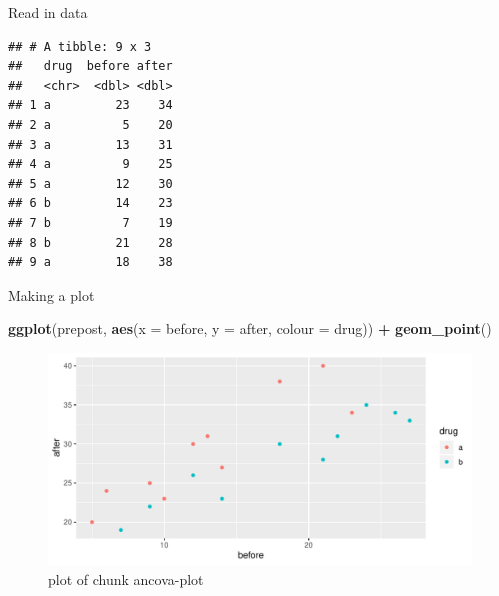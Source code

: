 \documentclass[ignorenonframetext,]{beamer}
\newenvironment{Shaded}{\begin{snugshade}}{\end{snugshade}}
\newcommand{\CommentTok}[1]{\textcolor[rgb]{0.56,0.35,0.01}{\textit{#1}}}
\newcommand{\DataTypeTok}[1]{\textcolor[rgb]{0.13,0.29,0.53}{#1}}
\newcommand{\DecValTok}[1]{\textcolor[rgb]{0.00,0.00,0.81}{#1}}
\newcommand{\KeywordTok}[1]{\textcolor[rgb]{0.13,0.29,0.53}{\textbf{#1}}}
\newcommand{\NormalTok}[1]{#1}
\newcommand{\OperatorTok}[1]{\textcolor[rgb]{0.81,0.36,0.00}{\textbf{#1}}}
\newcommand{\StringTok}[1]{\textcolor[rgb]{0.31,0.60,0.02}{#1}}
\begin{document}
\begin{frame}[fragile]{Read in data}
\protect\hypertarget{read-in-data-2}{}

\begin{Shaded}
\end{Shaded}

\begin{verbatim}
## # A tibble: 9 x 3
##   drug  before after
##   <chr>  <dbl> <dbl>
## 1 a         23    34
## 2 a          5    20
## 3 a         13    31
## 4 a          9    25
## 5 a         12    30
## 6 b         14    23
## 7 b          7    19
## 8 b         21    28
## 9 a         18    38
\end{verbatim}

\end{frame}

\begin{frame}[fragile]{Making a plot}
\protect\hypertarget{making-a-plot-1}{}

\begin{Shaded}
\begin{Highlighting}[]
\KeywordTok{ggplot}\NormalTok{(prepost, }\KeywordTok{aes}\NormalTok{(}\DataTypeTok{x =}\NormalTok{ before, }\DataTypeTok{y =}\NormalTok{ after, }\DataTypeTok{colour =}\NormalTok{ drug)) }\OperatorTok{+}
\StringTok{  }\KeywordTok{geom_point}\NormalTok{()}
\end{Highlighting}
\end{Shaded}

\begin{figure}
\centering
\includegraphics{figure/ancova-plot-1.pdf}
\caption{plot of chunk ancova-plot}
\end{figure}

\end{frame}
\end{document}
